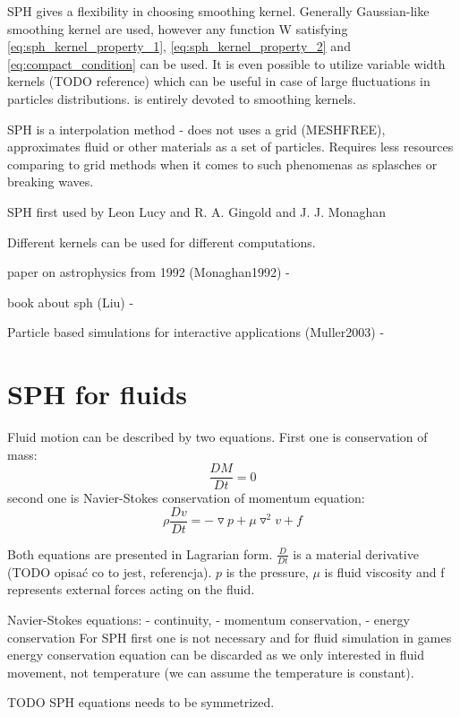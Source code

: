 SPH gives a flexibility in choosing smoothing kernel. Generally Gaussian-like smoothing kernel are used, however any function W satisfying \ref{eq:sph_kernel_property_1}, \ref{eq:sph_kernel_property_2} and \ref{eq:compact_condition} can be used. It is even possible to utilize variable width kernels (TODO reference) which can be useful in case of large fluctuations in particles distributions. \cite[chapter 3]{Liu} is entirely devoted to smoothing kernels. 

SPH is a interpolation method - does not uses a grid (MESHFREE), approximates fluid or other materials as a set of particles. Requires less resources comparing to grid methods when it comes to such phenomenas as splasches or breaking waves. 

SPH first used by Leon Lucy and R. A. Gingold and J. J. Monaghan

Different kernels can be used for different computations.


paper on astrophysics from 1992 (Monaghan1992) - \cite{Monaghan1992}

book about sph (Liu) - \cite{Liu}

Particle based simulations for interactive applications (Muller2003) - \cite{Muller2003}

\section{SPH for fluids}
Fluid motion can be described by two equations. First one is conservation of mass:
\begin{equation}
\label{eq:mass_conservation}
\frac{DM}{Dt} = 0
\end{equation}
second one is Navier-Stokes conservation of momentum equation:
\begin{equation}
\label{eq:momentum_conservation}
\rho \frac{Dv}{Dt} = -\triangledown p + \mu \triangledown^2v + f
\end{equation}

Both equations are presented in Lagrarian form. $\frac{D}{Dt}$ is a material derivative (TODO opisać co to jest, referencja).  $p$ is the pressure, $\mu$ is fluid viscosity and f represents external forces acting on the fluid. 

Navier-Stokes equations: 
 - continuity, 
 - momentum conservation, 
 - energy conservation
For SPH first one is not necessary and for fluid simulation in games energy conservation equation can be discarded as we only interested in fluid movement, not temperature (we can assume the temperature is constant). 

TODO SPH equations needs to be symmetrized.

